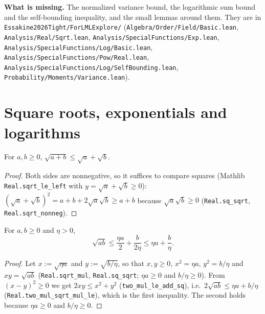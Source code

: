 \textbf{What is missing.} The normalized variance bound, the logarithmic sum bound and the
self-bounding inequality, and the small lemmas around them. They are in
\texttt{Essakine2026Tight/ForLMLExplore/} (\texttt{Algebra/Order/Field/Basic.lean},
\texttt{Analysis/Real/Sqrt.lean}, \texttt{Analysis/SpecialFunctions/Exp.lean},
\texttt{Analysis/SpecialFunctions/Log/Basic.lean}, \texttt{Analysis/SpecialFunctions/Pow/Real.lean},
\texttt{Analysis/SpecialFunctions/Log/SelfBounding.lean},
\texttt{Probability/Moments/Variance.lean}).

\section{Square roots, exponentials and logarithms}
\label{sec:pre_analysis_basic}

\begin{lemma}\label{lem:sqrt_add_le}
\leanok
For $a, b \ge 0$, $\sqrt{a + b} \le \sqrt a + \sqrt b$.
\end{lemma}

\begin{proof}
\leanok
Both sides are nonnegative, so it suffices to compare squares (Mathlib
\texttt{Real.sqrt\_le\_left} with $y = \sqrt a + \sqrt b \ge 0$):
$(\sqrt a + \sqrt b)^2 = a + b + 2\sqrt a\sqrt b \ge a + b$ because $\sqrt a\sqrt b \ge 0$
(\texttt{Real.sq\_sqrt}, \texttt{Real.sqrt\_nonneg}).
\end{proof}

\begin{lemma}\label{lem:sqrt_mul_le}
\leanok
For $a, b \ge 0$ and $\eta > 0$,
\[
  \sqrt{ab} \le \frac{\eta a}{2} + \frac{b}{2\eta} \le \eta a + \frac{b}{\eta} .
\]
\end{lemma}

\begin{proof}
\leanok
Let $x := \sqrt{\eta a}$ and $y := \sqrt{b/\eta}$, so that $x, y \ge 0$, $x^2 = \eta a$,
$y^2 = b/\eta$ and $xy = \sqrt{ab}$ (\texttt{Real.sqrt\_mul}, \texttt{Real.sq\_sqrt}; $\eta a \ge 0$
and $b/\eta \ge 0$). From $(x - y)^2 \ge 0$ we get $2xy \le x^2 + y^2$
(\texttt{two\_mul\_le\_add\_sq}), i.e.\ $2\sqrt{ab} \le \eta a + b/\eta$
(\texttt{Real.two\_mul\_sqrt\_mul\_le}), which is the first
inequality. The second holds because $\eta a \ge 0$ and $b/\eta \ge 0$.
\end{proof}

